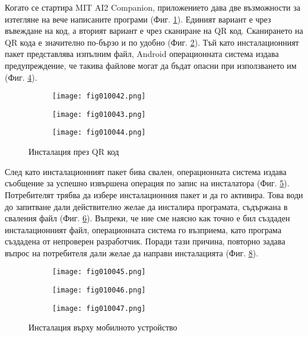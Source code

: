 Когато се стартира MIT AI2 Companion, приложението дава две възможности за изтегляне на вече написаните програми (Фиг. \ref{fig010042}). Единият вариант е чрез въвеждане на код, а вторият вариант е чрез сканиране на QR код. Сканирането на QR кода е значително по-бързо и по удобно (Фиг. \ref{fig010043}). Тъй като инсталационният пакет представлява изпълним файл, Android операционната система издава предупреждение, че такива файлове могат да бъдат опасни при използването им (Фиг. \ref{fig010044}).

\begin{figure}[H]
  \begin{subfigure}{0.31\textwidth}
  \texttt{[image: fig010042.png]}
  \label{fig010042}
  \end{subfigure}
  \begin{subfigure}{0.31\textwidth}
  \texttt{[image: fig010043.png]}
  \label{fig010043}
  \end{subfigure}
  \begin{subfigure}{0.31\textwidth}
  \texttt{[image: fig010044.png]}
  \label{fig010044}
  \end{subfigure}
  \caption{Инсталация през QR код}
\end{figure}

След като инсталационният пакет бива свален, операционната система издава съобщение за успешно извършена операция по запис на инсталатора (Фиг. \ref{fig010045}). Потребителят трябва да избере инсталационния пакет и да го активира. Това води до запитване дали действително желае да инсталира програмата, съдържана в сваления файл (Фиг. \ref{fig010046}). Въпреки, че ние сме наясно как точно е бил създаден инсталационният файл, операционната система го възприема, като програма създадена от непроверен разработчик. Поради тази причина, повторно задава въпрос на потребителя дали желае да направи инсталацията (Фиг. \ref{fig010047}). 

\begin{figure}[H]
  \begin{subfigure}{0.31\textwidth}
  \texttt{[image: fig010045.png]}
  \label{fig010045}
  \end{subfigure}
  \begin{subfigure}{0.31\textwidth}
  \texttt{[image: fig010046.png]}
  \label{fig010046}
  \end{subfigure}
  \begin{subfigure}{0.31\textwidth}
  \texttt{[image: fig010047.png]}
  \label{fig010047}
  \end{subfigure}
  \caption{Инсталация върху мобилното устройство}
\end{figure}

